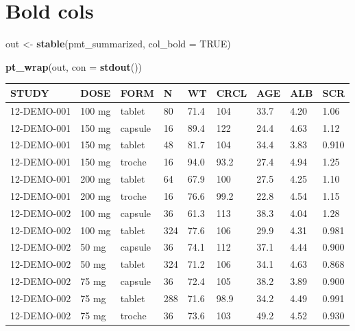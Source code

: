 \documentclass[
]{article}
\newenvironment{Shaded}{\begin{snugshade}}{\end{snugshade}}
\newcommand{\DataTypeTok}[1]{\textcolor[rgb]{0.13,0.29,0.53}{#1}}
\newcommand{\KeywordTok}[1]{\textcolor[rgb]{0.13,0.29,0.53}{\textbf{#1}}}
\newcommand{\NormalTok}[1]{#1}
\newcommand{\OtherTok}[1]{\textcolor[rgb]{0.56,0.35,0.01}{#1}}
\newcommand{\StringTok}[1]{\textcolor[rgb]{0.31,0.60,0.02}{#1}}
\begin{document}
\hypertarget{bold-cols}{%
\section{Bold cols}\label{bold-cols}}

\begin{Shaded}
\begin{Highlighting}[]
\NormalTok{out <-}\StringTok{ }\KeywordTok{stable}\NormalTok{(pmt_summarized, }\DataTypeTok{col_bold =} \OtherTok{TRUE}\NormalTok{)}

\KeywordTok{pt_wrap}\NormalTok{(out, }\DataTypeTok{con =} \KeywordTok{stdout}\NormalTok{()) }
\end{Highlighting}
\end{Shaded}

\begin{table}[h]
\centering
{\def\arraystretch{1.4}\tabcolsep=5pt
\begin{threeparttable}
\begin{tabular}[h]{lllllllll}
\hline
\textbf{STUDY} & \textbf{DOSE} & \textbf{FORM} & \textbf{N} & \textbf{WT} & \textbf{CRCL} & \textbf{AGE} & \textbf{ALB} & \textbf{SCR} \\
\hline
12-DEMO-001 & 100 mg & tablet & 80 & 71.4 & 104 & 33.7 & 4.20 & 1.06 \\
12-DEMO-001 & 150 mg & capsule & 16 & 89.4 & 122 & 24.4 & 4.63 & 1.12 \\
12-DEMO-001 & 150 mg & tablet & 48 & 81.7 & 104 & 34.4 & 3.83 & 0.910 \\
12-DEMO-001 & 150 mg & troche & 16 & 94.0 & 93.2 & 27.4 & 4.94 & 1.25 \\
12-DEMO-001 & 200 mg & tablet & 64 & 67.9 & 100 & 27.5 & 4.25 & 1.10 \\
12-DEMO-001 & 200 mg & troche & 16 & 76.6 & 99.2 & 22.8 & 4.54 & 1.15 \\
12-DEMO-002 & 100 mg & capsule & 36 & 61.3 & 113 & 38.3 & 4.04 & 1.28 \\
12-DEMO-002 & 100 mg & tablet & 324 & 77.6 & 106 & 29.9 & 4.31 & 0.981 \\
12-DEMO-002 & 50 mg & capsule & 36 & 74.1 & 112 & 37.1 & 4.44 & 0.900 \\
12-DEMO-002 & 50 mg & tablet & 324 & 71.2 & 106 & 34.1 & 4.63 & 0.868 \\
12-DEMO-002 & 75 mg & capsule & 36 & 72.4 & 105 & 38.2 & 3.89 & 0.900 \\
12-DEMO-002 & 75 mg & tablet & 288 & 71.6 & 98.9 & 34.2 & 4.49 & 0.991 \\
12-DEMO-002 & 75 mg & troche & 36 & 73.6 & 103 & 49.2 & 4.52 & 0.930 \\
\hline
\end{tabular}
\end{threeparttable}
}
\end{table}
\end{document}
